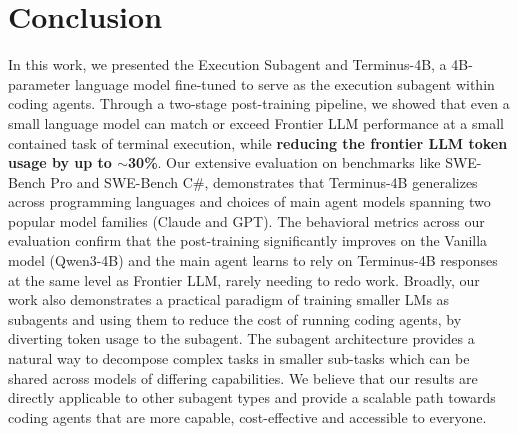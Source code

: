 \documentclass[sigconf,review]{acmart}
\begin{document}
\section{Conclusion}
In this work, we presented the Execution Subagent and Terminus-4B, a 4B-parameter language model fine-tuned to serve as the execution subagent within coding agents. Through a two-stage post-training pipeline, we showed that even a small language model can match or exceed Frontier LLM performance at a small contained task of terminal execution, while \textbf{reducing the frontier LLM token usage by up to $\sim$30\%}. Our extensive evaluation on benchmarks like SWE-Bench Pro and SWE-Bench C\#, demonstrates that Terminus-4B generalizes across programming languages and choices of main agent models spanning two popular model families (Claude and GPT). The behavioral metrics across our evaluation confirm that the post-training significantly improves on the Vanilla model (Qwen3-4B) and the main agent learns to rely on Terminus-4B responses at the same level as Frontier LLM, rarely needing to redo work. Broadly, our work also demonstrates a practical paradigm of training smaller LMs as subagents and using them to reduce the cost of running coding agents, by diverting token usage to the subagent. The subagent architecture provides a natural way to decompose complex tasks in smaller sub-tasks which can be shared across models of differing capabilities. We believe that our results are directly applicable to other subagent types and provide a scalable path towards coding agents that are more capable, cost-effective and accessible to everyone.




\end{document}
